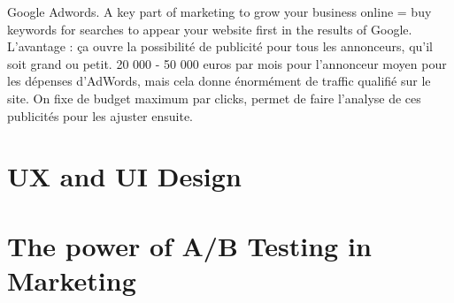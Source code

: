 Google Adwords. A key part of marketing to grow your business online = buy keywords for searches to appear
your website first in the results of Google.
L'avantage : ça ouvre la possibilité de publicité pour tous les annonceurs, qu'il soit grand ou petit. 20 000 -
50 000 euros par mois pour l'annonceur moyen pour les dépenses d'AdWords, mais cela donne énormément
de traffic qualifié sur le site.
On fixe de budget maximum par clicks, permet de faire l'analyse de ces publicités pour les ajuster ensuite.

\section{UX and UI Design}

\section{The power of A/B Testing in Marketing}
